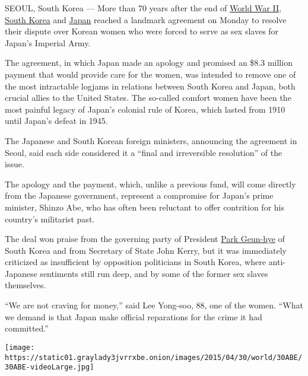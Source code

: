 SEOUL, South Korea --- More than 70 years after the end of
\href{http://topics.nytimes3xbfgragh.onion/top/reference/timestopics/subjects/w/world_war_ii_/index.html?inline=nyt-classifier}{World
War II},
\href{http://topics.nytimes3xbfgragh.onion/top/news/international/countriesandterritories/southkorea/index.html?inline=nyt-geo}{South
Korea} and
\href{http://topics.nytimes3xbfgragh.onion/top/news/international/countriesandterritories/japan/index.html?inline=nyt-geo}{Japan}
reached a landmark agreement on Monday to resolve their dispute over
Korean women who were forced to serve as sex slaves for Japan's Imperial
Army.

The agreement, in which Japan made an apology and promised an \$8.3
million payment that would provide care for the women, was intended to
remove one of the most intractable logjams in relations between South
Korea and Japan, both crucial allies to the United States. The so-called
comfort women have been the most painful legacy of Japan's colonial rule
of Korea, which lasted from 1910 until Japan's defeat in 1945.

The Japanese and South Korean foreign ministers, announcing the
agreement in Seoul, said each side considered it a ``final and
irreversible resolution'' of the issue.

The apology and the payment, which, unlike a previous fund, will come
directly from the Japanese government, represent a compromise for
Japan's prime minister, Shinzo Abe, who has often been reluctant to
offer contrition for his country's militarist past.

The deal won praise from the governing party of President
\href{http://topics.nytimes3xbfgragh.onion/top/reference/timestopics/people/p/park_geunhye/index.html?inline=nyt-per}{Park
Geun-hye} of South Korea and from Secretary of State John Kerry, but it
was immediately criticized as insufficient by opposition politicians in
South Korea, where anti-Japanese sentiments still run deep, and by some
of the former sex slaves themselves.

``We are not craving for money,'' said Lee Yong-soo, 88, one of the
women. ``What we demand is that Japan make official reparations for the
crime it had committed.''

\href{https://www.nytimes3xbfgragh.onion/interactive/2015/08/13/world/asia/japan-ww2-shinzo-abe.html}{}

\texttt{[image: https://static01.graylady3jvrrxbe.onion/images/2015/04/30/world/30ABE/30ABE-videoLarge.jpg]}

